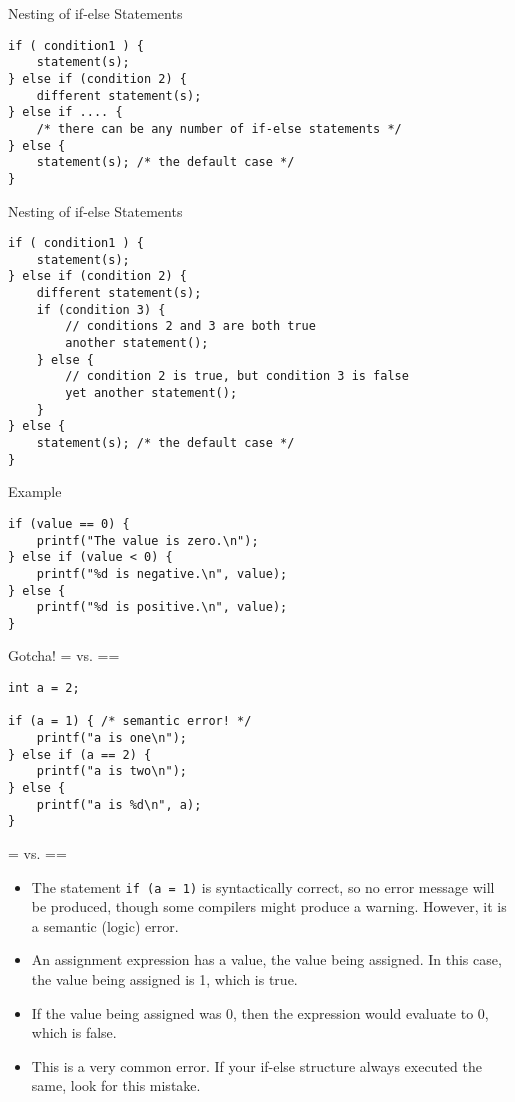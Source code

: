 \documentclass[graphics]{beamer}
\begin{document}
\begin{frame}[fragile]{Nesting of if-else Statements}
\begin{verbatim}
if ( condition1 ) {
    statement(s);
} else if (condition 2) {
    different statement(s);
} else if .... {
    /* there can be any number of if-else statements */
} else {
    statement(s); /* the default case */
}
\end{verbatim}
\end{frame}

\begin{frame}[fragile]{Nesting of if-else Statements}
\begin{verbatim}
if ( condition1 ) {
    statement(s);
} else if (condition 2) {
    different statement(s);
    if (condition 3) {
        // conditions 2 and 3 are both true
        another statement();
    } else {
        // condition 2 is true, but condition 3 is false
        yet another statement();
    }
} else {
    statement(s); /* the default case */
}
\end{verbatim}
\end{frame}

\begin{frame}[fragile]{Example}
\begin{verbatim}
if (value == 0) {
    printf("The value is zero.\n");
} else if (value < 0) {
    printf("%d is negative.\n", value);
} else {
    printf("%d is positive.\n", value);
}
\end{verbatim}
\end{frame}

\begin{frame}[fragile]{Gotcha! = vs. ==}
\begin{verbatim}
int a = 2;

if (a = 1) { /* semantic error! */
    printf("a is one\n");
} else if (a == 2) {
    printf("a is two\n");
} else {
    printf("a is %d\n", a);
}
\end{verbatim}
\end{frame}

\begin{frame}{= vs. ==}
    \begin{itemize}
        \item The statement \texttt{if (a = 1)} is syntactically correct, so no error message will be produced, though some compilers might produce a warning. However, it is a semantic (logic) error.
        \item An assignment expression has a value, the value being assigned. In this case, the value being assigned is 1, which is true.
        \item If the value being assigned was 0, then the expression would evaluate to 0, which is false.
        \item This is a very common error. If your if-else structure always executed the same, look for this mistake.
    \end{itemize}
\end{frame}
\end{document}
